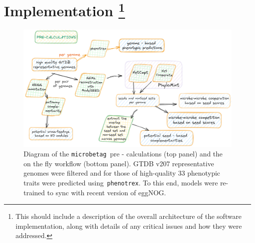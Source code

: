 \documentclass[sn-mathphys,Numbered]{sn-jnl}  %
\theoremstyle{thmstyleone}%
\theoremstyle{thmstyletwo}%
\theoremstyle{thmstylethree}%
\newcommand{\microbetag}{\texttt{microbetag }}
\begin{document}


 
\section*{Implementation
    \footnote{
        This should include a description of the overall architecture of the software implementation, along with details of any critical issues and how they were addressed.
    }
}
\label{sec:implementation}


    \begin{figure}[h!]
        \label{fig:precalc}
        \includegraphics[width=0.9\columnwidth]{figs/microbetag-precal.png}
        \caption{
            Diagram of the \microbetag pre - calculations (top panel) and the on the fly workflow (bottom panel). 
            GTDB v207 representative genomes were filtered and for those of high-quality
            33 phenotypic traits were predicted using~\texttt{phenotrex}.
            To this end, models were re-trained to sync with recent version of eggNOG.
        }
    \end{figure}
\end{document}
